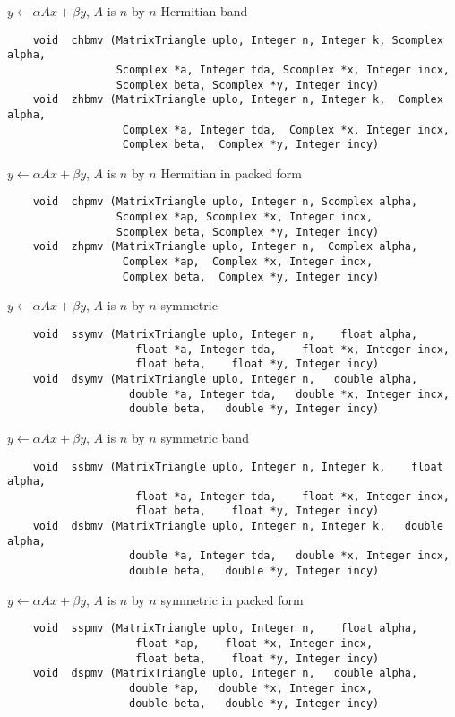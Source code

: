 \normalsize
$y \leftarrow \alpha Ax + \beta y$, $A$ is $n$ by $n$ Hermitian band
\footnotesize
\begin{verbatim}
    void  chbmv (MatrixTriangle uplo, Integer n, Integer k, Scomplex alpha, 
                 Scomplex *a, Integer tda, Scomplex *x, Integer incx,
                 Scomplex beta, Scomplex *y, Integer incy)
    void  zhbmv (MatrixTriangle uplo, Integer n, Integer k,  Complex alpha,
                  Complex *a, Integer tda,  Complex *x, Integer incx,
                  Complex beta,  Complex *y, Integer incy) 
\end{verbatim}
\normalsize
$y \leftarrow \alpha Ax + \beta y$, $A$ is $n$ by $n$ Hermitian in
packed form
\footnotesize
\begin{verbatim}
    void  chpmv (MatrixTriangle uplo, Integer n, Scomplex alpha,
                 Scomplex *ap, Scomplex *x, Integer incx,
                 Scomplex beta, Scomplex *y, Integer incy)
    void  zhpmv (MatrixTriangle uplo, Integer n,  Complex alpha,
                  Complex *ap,  Complex *x, Integer incx,
                  Complex beta,  Complex *y, Integer incy)
\end{verbatim}
\normalsize
$y \leftarrow \alpha Ax + \beta y$, $A$ is $n$ by $n$ symmetric
\footnotesize
\begin{verbatim}
    void  ssymv (MatrixTriangle uplo, Integer n,    float alpha,
                    float *a, Integer tda,    float *x, Integer incx,
                    float beta,    float *y, Integer incy)
    void  dsymv (MatrixTriangle uplo, Integer n,   double alpha,
                   double *a, Integer tda,   double *x, Integer incx,
                   double beta,   double *y, Integer incy) 
\end{verbatim}
\normalsize
$y \leftarrow \alpha Ax + \beta y$, $A$ is $n$ by $n$ symmetric band
\footnotesize
\begin{verbatim}
    void  ssbmv (MatrixTriangle uplo, Integer n, Integer k,    float alpha,
                    float *a, Integer tda,    float *x, Integer incx,
                    float beta,    float *y, Integer incy)
    void  dsbmv (MatrixTriangle uplo, Integer n, Integer k,   double alpha,
                   double *a, Integer tda,   double *x, Integer incx,
                   double beta,   double *y, Integer incy)
\end{verbatim}
\normalsize
$y \leftarrow \alpha Ax + \beta y$, $A$ is $n$ by $n$ symmetric in packed 
form
\footnotesize
\begin{verbatim}
    void  sspmv (MatrixTriangle uplo, Integer n,    float alpha,
                    float *ap,    float *x, Integer incx,
                    float beta,    float *y, Integer incy)
    void  dspmv (MatrixTriangle uplo, Integer n,   double alpha,
                   double *ap,   double *x, Integer incx,
                   double beta,   double *y, Integer incy)
\end{verbatim}
